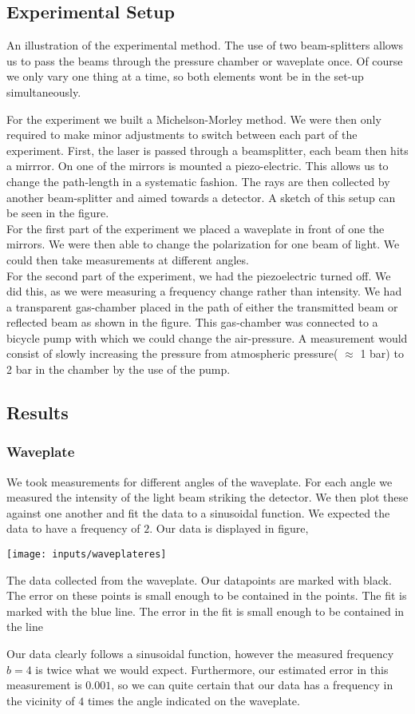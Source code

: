 \documentclass[working, oneside]{inputs/tuftebook}
\begin{document}
\subsection*{Experimental Setup}
\begin{marginfigure}[-100pt]
	\centering
	\caption{An illustration of the experimental method. The use of two beam-splitters allows us to pass the beams through the pressure chamber or waveplate once. Of course we only vary one thing at a time, so both elements wont be in the set-up simultaneously.}
	\label{fig:}
\end{marginfigure}
For the experiment we built a Michelson-Morley method. We were then only required to make minor adjustments to switch between each part of the experiment. First, the laser is passed through a beamsplitter, each beam then hits a mirrror. On one of the mirrors is mounted a piezo-electric. This allows us to change the path-length in a systematic fashion. The rays are then collected by another beam-splitter and aimed towards a detector. A sketch of this setup can be seen in the figure. \\
For the first part of the experiment we placed a waveplate in front of one the mirrors. We were then able to change the polarization for one beam of light. We could then take measurements at different angles. 
\\
For the second part of the experiment, we had the piezoelectric turned off. We did this, as we were measuring a frequency change rather than intensity. We had a transparent gas-chamber placed in the path of either the transmitted beam or reflected beam as shown in the figure. This gas-chamber was connected to a bicycle pump with which we could change the air-pressure. A measurement would consist of slowly increasing the pressure from atmospheric pressure( $\approx$ 1 bar) to 2 bar in the chamber by the use of the pump. 
\subsection*{Results}
\subsubsection*{Waveplate}
We took measurements for different angles of the waveplate. For each angle we measured the intensity of the light beam striking the detector. We then plot these against one another and fit the data to a sinusoidal function. We expected the data to have a frequency of $2$. Our data is displayed in figure,
\begin{marginfigure}[-55pt]
	\centering
	\texttt{[image: inputs/waveplateres]}
	\caption{The data collected from the waveplate. Our datapoints are marked with black. The error on these points is small enough to be contained in the points. The fit is marked with the blue line. The error in the fit is small enough to be contained in the line}
\end{marginfigure}
Our data clearly follows a sinusoidal function, however the measured frequency $b = 4$ is twice what we would expect. Furthermore, our estimated error in this measurement is $0.001$, so we can quite certain that our data has a frequency in the vicinity of $4$ times the angle indicated on the waveplate.
\end{document}
